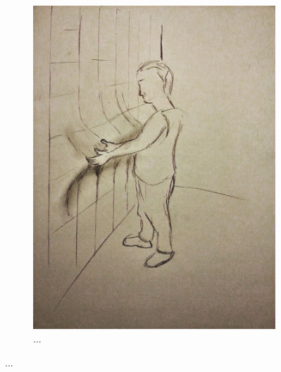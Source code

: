 \begin{figure}[h]
\begin{subfigure}[t]{.44\textwidth}
    \includegraphics[width=\linewidth]{figures/jamming/concepts/impro/pull}
    \caption{...}
  \end{subfigure}
  \caption{...}
\label{fig:ch:jamming:concepts:impro}
\end{figure}

